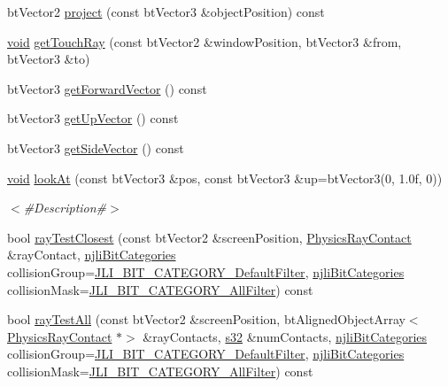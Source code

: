 \begin{DoxyCompactItemize}
\item 
bt\+Vector2 \mbox{\hyperlink{classnjli_1_1_camera_a5cb19ed6cae871c33120f5a8662d04a7}{project}} (const bt\+Vector3 \&object\+Position) const
\item 
\mbox{\hyperlink{_thread_8h_af1e856da2e658414cb2456cb6f7ebc66}{void}} \mbox{\hyperlink{classnjli_1_1_camera_acebff379eca9f4d2d4427473a0f0c9fa}{get\+Touch\+Ray}} (const bt\+Vector2 \&window\+Position, bt\+Vector3 \&from, bt\+Vector3 \&to)
\item 
bt\+Vector3 \mbox{\hyperlink{classnjli_1_1_camera_a5ce9c9208b4eb42baf2bffc077bc6679}{get\+Forward\+Vector}} () const
\item 
bt\+Vector3 \mbox{\hyperlink{classnjli_1_1_camera_a3042125c6d21a4e239324637f94b43d8}{get\+Up\+Vector}} () const
\item 
bt\+Vector3 \mbox{\hyperlink{classnjli_1_1_camera_a2099681caa7c779a5b0da74c1be3ee56}{get\+Side\+Vector}} () const
\item 
\mbox{\hyperlink{_thread_8h_af1e856da2e658414cb2456cb6f7ebc66}{void}} \mbox{\hyperlink{classnjli_1_1_camera_a452756c63a51e1f2499d0581a2405327}{look\+At}} (const bt\+Vector3 \&pos, const bt\+Vector3 \&up=bt\+Vector3(0, 1.\+0f, 0))
\begin{DoxyCompactList}\small\item\em $<$\#\+Description\#$>$ \end{DoxyCompactList}\item 
bool \mbox{\hyperlink{classnjli_1_1_camera_aaade7beab2611ec8c0db373658465735}{ray\+Test\+Closest}} (const bt\+Vector2 \&screen\+Position, \mbox{\hyperlink{classnjli_1_1_physics_ray_contact}{Physics\+Ray\+Contact}} \&ray\+Contact, \mbox{\hyperlink{namespacenjli_af7b302a2b48bb644f85c88080925c974}{njli\+Bit\+Categories}} collision\+Group=\mbox{\hyperlink{namespacenjli_af7b302a2b48bb644f85c88080925c974a53b33337014e199f56e752574f36981e}{J\+L\+I\+\_\+\+B\+I\+T\+\_\+\+C\+A\+T\+E\+G\+O\+R\+Y\+\_\+\+Default\+Filter}}, \mbox{\hyperlink{namespacenjli_af7b302a2b48bb644f85c88080925c974}{njli\+Bit\+Categories}} collision\+Mask=\mbox{\hyperlink{namespacenjli_af7b302a2b48bb644f85c88080925c974a0fba80cad161dda96de5cbda9091cdce}{J\+L\+I\+\_\+\+B\+I\+T\+\_\+\+C\+A\+T\+E\+G\+O\+R\+Y\+\_\+\+All\+Filter}}) const
\item 
bool \mbox{\hyperlink{classnjli_1_1_camera_a88cb37e1d85fdfa9b20601880c73b335}{ray\+Test\+All}} (const bt\+Vector2 \&screen\+Position, bt\+Aligned\+Object\+Array$<$ \mbox{\hyperlink{classnjli_1_1_physics_ray_contact}{Physics\+Ray\+Contact}} $\ast$$>$ \&ray\+Contacts, \mbox{\hyperlink{_util_8h_aa62c75d314a0d1f37f79c4b73b2292e2}{s32}} \&num\+Contacts, \mbox{\hyperlink{namespacenjli_af7b302a2b48bb644f85c88080925c974}{njli\+Bit\+Categories}} collision\+Group=\mbox{\hyperlink{namespacenjli_af7b302a2b48bb644f85c88080925c974a53b33337014e199f56e752574f36981e}{J\+L\+I\+\_\+\+B\+I\+T\+\_\+\+C\+A\+T\+E\+G\+O\+R\+Y\+\_\+\+Default\+Filter}}, \mbox{\hyperlink{namespacenjli_af7b302a2b48bb644f85c88080925c974}{njli\+Bit\+Categories}} collision\+Mask=\mbox{\hyperlink{namespacenjli_af7b302a2b48bb644f85c88080925c974a0fba80cad161dda96de5cbda9091cdce}{J\+L\+I\+\_\+\+B\+I\+T\+\_\+\+C\+A\+T\+E\+G\+O\+R\+Y\+\_\+\+All\+Filter}}) const
$$
\end{DoxyCompactItemize}
